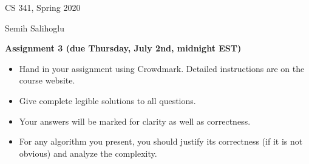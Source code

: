 \documentclass[11pt]{article}
\begin{document}
\hfill CS 341, Spring 2020\par
\hfill Semih Salihoglu

\bigskip
\begin{center}\large\bf Assignment 3 (due Thursday, July 2nd, midnight EST)
\end{center}

\begin{itemize}
\item Hand in your assignment using Crowdmark. Detailed instructions are on the course website.
\item Give complete legible solutions to all questions.
\item Your answers will be marked for clarity as well as correctness.
\item For any algorithm you present, you should justify its correctness
(if it is not obvious) and analyze the complexity.
\end{itemize}
\end{document}
